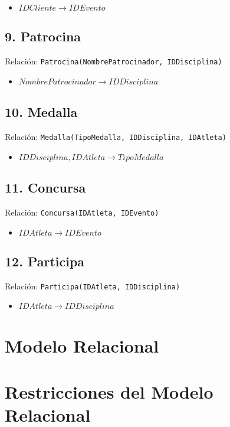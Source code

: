 \begin{itemize}
    \item $IDCliente \rightarrow IDEvento$
\end{itemize}


\subsection*{9. Patrocina}
Relación: \texttt{Patrocina(NombrePatrocinador, IDDisciplina)}

\begin{itemize}
    \item $NombrePatrocinador \rightarrow IDDisciplina$
\end{itemize}

\subsection*{10. Medalla}
Relación: \texttt{Medalla(TipoMedalla, IDDisciplina, IDAtleta)}

\begin{itemize}
    \item $IDDisciplina, IDAtleta \rightarrow TipoMedalla$
\end{itemize}

\subsection*{11. Concursa}
Relación: \texttt{Concursa(IDAtleta, IDEvento)}

\begin{itemize}
    \item $IDAtleta \rightarrow  IDEvento$
\end{itemize}

\subsection*{12. Participa}
Relación: \texttt{Participa(IDAtleta, IDDisciplina)}

\begin{itemize}
    \item $IDAtleta \rightarrow IDDisciplina$
\end{itemize}

\section*{Modelo Relacional}
\section*{Restricciones del Modelo Relacional}

